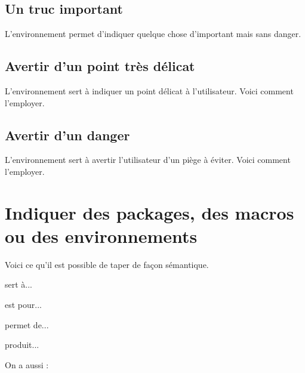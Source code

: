 
\subsection{Un truc important}

L'environnement  permet d'indiquer quelque chose d'important mais sans danger.




\subsection{Avertir d'un point très délicat}

L'environnement  sert à indiquer un point délicat à  l'utilisateur. Voici comment l'employer.




\subsection{Avertir d'un danger}

L'environnement  sert à avertir l'utilisateur d'un piège à éviter. Voici comment l'employer.



\section{Indiquer des packages, des macros ou des environnements}

Voici ce qu'il est possible de taper de façon sémantique.

\begin{bdoclatex}[sbs]
 sert à...

 est pour...

 permet de...

 produit...

On a aussi :

\end{bdoclatex}


